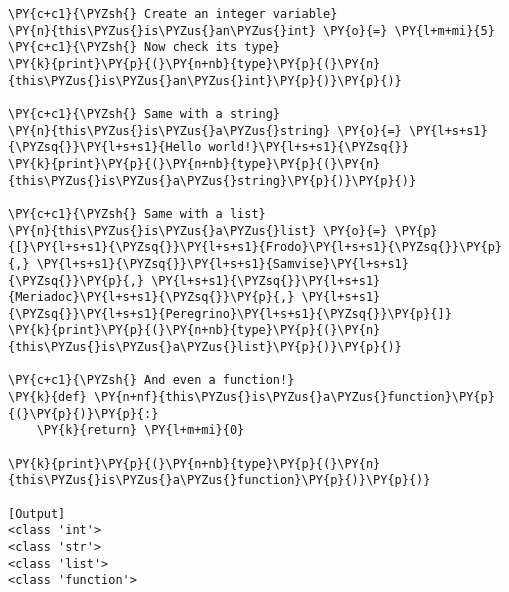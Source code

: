 \begin{Verbatim}[label=\makebox{\url{https://github.com/lucabaldini/cmepda/tree/master/slides/latex/snippets/everything\_is\_a\_class.py}},commandchars=\\\{\}]
\PY{c+c1}{\PYZsh{} Create an integer variable}
\PY{n}{this\PYZus{}is\PYZus{}an\PYZus{}int} \PY{o}{=} \PY{l+m+mi}{5}
\PY{c+c1}{\PYZsh{} Now check its type}
\PY{k}{print}\PY{p}{(}\PY{n+nb}{type}\PY{p}{(}\PY{n}{this\PYZus{}is\PYZus{}an\PYZus{}int}\PY{p}{)}\PY{p}{)}

\PY{c+c1}{\PYZsh{} Same with a string}
\PY{n}{this\PYZus{}is\PYZus{}a\PYZus{}string} \PY{o}{=} \PY{l+s+s1}{\PYZsq{}}\PY{l+s+s1}{Hello world!}\PY{l+s+s1}{\PYZsq{}} 
\PY{k}{print}\PY{p}{(}\PY{n+nb}{type}\PY{p}{(}\PY{n}{this\PYZus{}is\PYZus{}a\PYZus{}string}\PY{p}{)}\PY{p}{)}

\PY{c+c1}{\PYZsh{} Same with a list}
\PY{n}{this\PYZus{}is\PYZus{}a\PYZus{}list} \PY{o}{=} \PY{p}{[}\PY{l+s+s1}{\PYZsq{}}\PY{l+s+s1}{Frodo}\PY{l+s+s1}{\PYZsq{}}\PY{p}{,} \PY{l+s+s1}{\PYZsq{}}\PY{l+s+s1}{Samvise}\PY{l+s+s1}{\PYZsq{}}\PY{p}{,} \PY{l+s+s1}{\PYZsq{}}\PY{l+s+s1}{Meriadoc}\PY{l+s+s1}{\PYZsq{}}\PY{p}{,} \PY{l+s+s1}{\PYZsq{}}\PY{l+s+s1}{Peregrino}\PY{l+s+s1}{\PYZsq{}}\PY{p}{]}
\PY{k}{print}\PY{p}{(}\PY{n+nb}{type}\PY{p}{(}\PY{n}{this\PYZus{}is\PYZus{}a\PYZus{}list}\PY{p}{)}\PY{p}{)}

\PY{c+c1}{\PYZsh{} And even a function!}
\PY{k}{def} \PY{n+nf}{this\PYZus{}is\PYZus{}a\PYZus{}function}\PY{p}{(}\PY{p}{)}\PY{p}{:}
    \PY{k}{return} \PY{l+m+mi}{0}
    
\PY{k}{print}\PY{p}{(}\PY{n+nb}{type}\PY{p}{(}\PY{n}{this\PYZus{}is\PYZus{}a\PYZus{}function}\PY{p}{)}\PY{p}{)}

[Output]
<class 'int'>
<class 'str'>
<class 'list'>
<class 'function'>
\end{Verbatim}